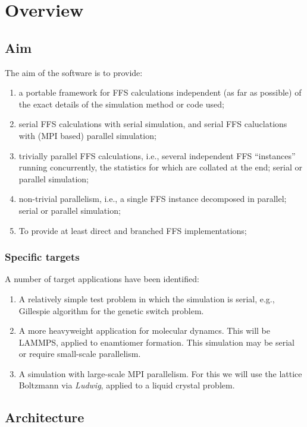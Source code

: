 \documentclass[11pt]{article}
\begin{document}

\section{Overview}

\subsection{Aim}

The aim of the software is to provide:
\begin{enumerate}
\item a portable framework for FFS calculations independent
(as far as possible) of the exact details of the simulation
method or code used;
\item serial FFS calculations with serial simulation, and
serial FFS caluclations with (MPI based) parallel simulation;
\item trivially parallel FFS calculations, i.e.,  several independent
FFS ``instances'' running concurrently, the statistics for which are
collated at the end; serial or parallel simulation;
\item non-trivial parallelism, i.e., a single FFS instance
decomposed in parallel; serial or parallel simulation;
\item To provide at least direct and branched FFS implementations;
\end{enumerate}

\subsubsection{Specific targets}

A number of target applications have been identified:

\begin{enumerate}
\item A relatively simple test problem in which the simulation is
serial, e.g., Gillespie algorithm for the genetic switch problem.
\item A more heavyweight application for molecular dynamcs. This
will be LAMMPS, applied to enamtiomer formation. This simulation
may be serial or require small-scale parallelism.
\item A simulation with large-scale MPI parallelism. For this we
will use the lattice Boltzmann via \textit{Ludwig}, applied to
a liquid crystal problem.
\end{enumerate}


\subsection{Architecture}
\end{document}
